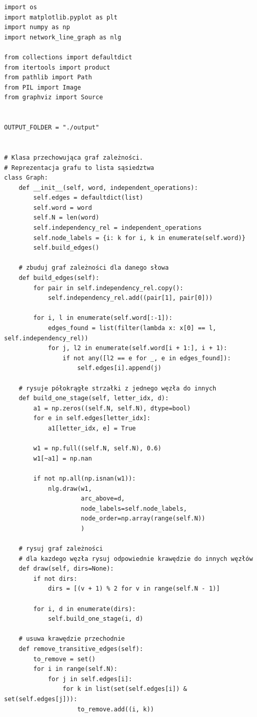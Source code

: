 \documentclass[12pt]{article}
\begin{document}
\begin{verbatim}
import os
import matplotlib.pyplot as plt
import numpy as np
import network_line_graph as nlg

from collections import defaultdict
from itertools import product
from pathlib import Path
from PIL import Image
from graphviz import Source


OUTPUT_FOLDER = "./output"


# Klasa przechowująca graf zależności.
# Reprezentacja grafu to lista sąsiedztwa
class Graph:
    def __init__(self, word, independent_operations):
        self.edges = defaultdict(list)
        self.word = word
        self.N = len(word)
        self.independency_rel = independent_operations
        self.node_labels = {i: k for i, k in enumerate(self.word)}
        self.build_edges()

    # zbuduj graf zależności dla danego słowa
    def build_edges(self):
        for pair in self.independency_rel.copy():
            self.independency_rel.add((pair[1], pair[0]))

        for i, l in enumerate(self.word[:-1]):
            edges_found = list(filter(lambda x: x[0] == l, self.independency_rel))
            for j, l2 in enumerate(self.word[i + 1:], i + 1):
                if not any([l2 == e for _, e in edges_found]):
                    self.edges[i].append(j)

    # rysuje półokrągłe strzałki z jednego węzła do innych
    def build_one_stage(self, letter_idx, d):
        a1 = np.zeros((self.N, self.N), dtype=bool)
        for e in self.edges[letter_idx]:
            a1[letter_idx, e] = True

        w1 = np.full((self.N, self.N), 0.6)
        w1[~a1] = np.nan

        if not np.all(np.isnan(w1)):
            nlg.draw(w1,
                     arc_above=d,
                     node_labels=self.node_labels,
                     node_order=np.array(range(self.N))
                     )

    # rysuj graf zależności
    # dla kazdego węzła rysuj odpowiednie krawędzie do innych węzłów
    def draw(self, dirs=None):
        if not dirs:
            dirs = [(v + 1) % 2 for v in range(self.N - 1)]

        for i, d in enumerate(dirs):
            self.build_one_stage(i, d)

    # usuwa krawędzie przechodnie
    def remove_transitive_edges(self):
        to_remove = set()
        for i in range(self.N):
            for j in self.edges[i]:
                for k in list(set(self.edges[i]) & set(self.edges[j])):
                    to_remove.add((i, k))


\end{verbatim}
\end{document}
